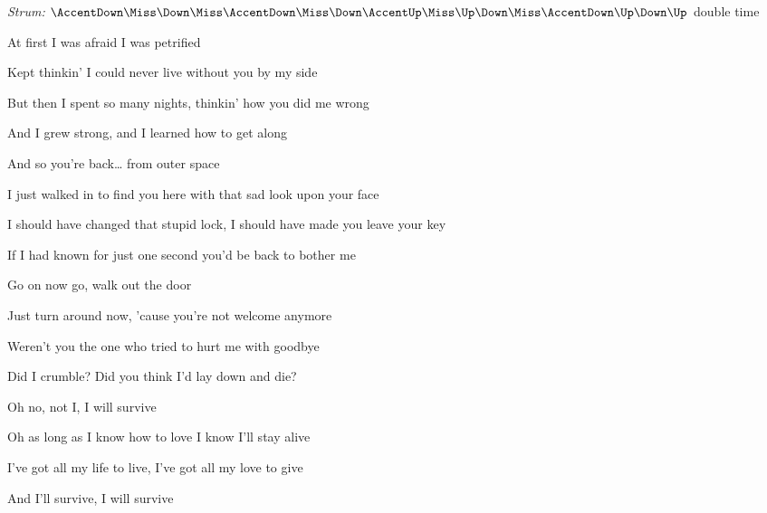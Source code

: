 \begin{song}


\begin{headerbox}
\textit{Strum:} $\AccentDown\Miss\Down\Miss\AccentDown\Miss\Down\AccentUp \Miss\Up\Down\Miss\AccentDown\Up\Down\Up$ double time
\end{headerbox}

\begin{hchordbox}
\end{hchordbox}

\bigskip

 \par
\smallskip
At first I was afraid I was petrified \par
Kept thinkin' I could never live without you by my side \par
But then I spent so many nights, thinkin' how you did me wrong \par
And I grew strong, and I learned how to get along \par

\bigskip

And so you're back… from outer space \par
I just walked in to find you here with that sad look upon your face \par
I should have changed that stupid lock, I should have made you leave your key \par
If I had known for just one second you'd be back to bother me \par

\bigskip

\begin{chorusbox}{\PrechorusAndChorus}
Go on now go, walk out the door \par
Just turn around now, 'cause you're not welcome anymore \par
{} Weren't you the one who tried to hurt me with goodbye \par
Did I crumble? Did you think I'd lay down and die? \par

\bigskip

Oh no, not I, I will survive \par
Oh as long as I know how to love I know I'll stay alive \par
I've got all my life to live, I've got all my love to give \par
And I'll survive, I will survive \par


\end{chorusbox}
\end{song}
